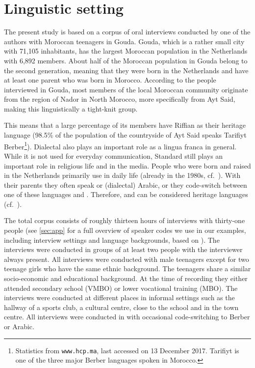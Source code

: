 \documentclass[output=paper]{langsci/langscibook}
\begin{document}
\section{Linguistic setting}
\label{sec:lingset}
\noindent The present study is based on a corpus of oral interviews conducted
by one of the authors with Moroccan  teenagers in Gouda. Gouda, which is a
rather small city with 71,105 inhabitants, has the largest Moroccan 
population in the Netherlands with 6,892 members. About half of the Moroccan
population in Gouda belong to the second generation, meaning that they were
born in the Netherlands and have at least one parent who was born in Morocco.
According to the people interviewed in Gouda, most members of the local
Moroccan  community originate from the region of Nador in North Morocco,
more specifically from Ayt Said, making this linguistically a tight-knit group.

This means that a large percentage of its members have Riffian  as their
heritage language (98.5\% of the population of the countryside of Ayt Said
speaks Tarifiyt Berber\footnote{Statistics from \texttt{www.hcp.ma}, last
accessed on 13 December 2017. Tarifiyt  is one of the three major Berber
languages spoken in Morocco.}). Dialectal  also plays an important role
as a lingua franca in general. While it is not used for everyday communication,
Standard  still plays an important role in religious life and in the
media. People who were born and raised in the Netherlands primarily use 
in daily life (already in the 1980s, cf.\ \citealt{DeRuiter:1989}). With their
parents they often speak  or (dialectal) Arabic, or they
code-switch between one of these languages and . Therefore,
 and  can be considered heritage languages (cf.\
\citealt{Montrul:2016}).

The total corpus consists of roughly thirteen hours of interviews with
thirty-one people (see \ref{sec:app} for a full overview of speaker
codes we use in our examples, including interview settings and language
backgrounds, based on \citealt{Mourigh:fc}). The interviews were conducted in
groups of at least two people with the interviewer always present. All
interviews were conducted with male teenagers except for two teenage girls who
have the same ethnic background. The teenagers share a similar socio-economic
and educational background. At the time of recording they either attended
secondary school (VMBO) or lower vocational training (MBO). The interviews were
conducted at different places in informal settings such as the hallway of a
sports club, a cultural centre, close to the school and in the town centre.
All interviews were conducted in \ili{Dutch} with occasional code-switching to Berber
or Arabic.
\end{document}
